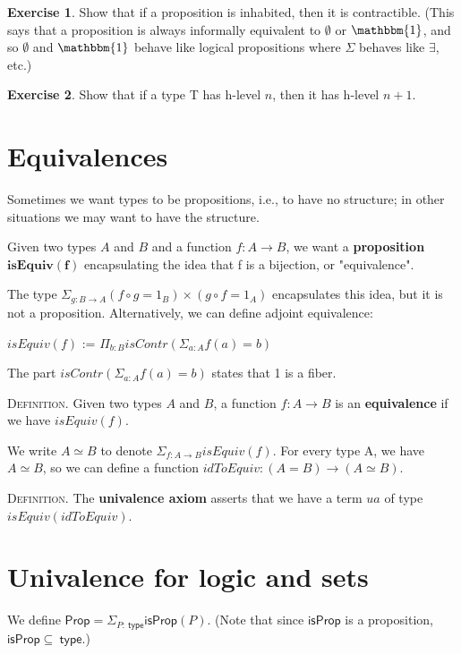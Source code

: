 \documentclass{amsart}
\theoremstyle{definition}
\newtheorem{ex}{Exercise}[section]
\newcommand{\type}{\ensuremath{\mathsf{~type}}}
\newcommand{\Prop}{\ensuremath{\mathsf{Prop}}}
\newcommand{\isProp}{\ensuremath{\mathsf{isProp}}}
\begin{document}
\begin{ex}
Show that if a proposition is inhabited, then it is contractible. (This says that a proposition is always informally equivalent to $\emptyset$ or $\mathbbm{1}$, and so $\emptyset$ and $\mathbbm{1}$ behave like logical propositions where $\Sigma$ behaves like $\exists$, etc.) %
\end{ex}

\begin{ex}
Show that if a type T has h-level $n$, then it has h-level $n + 1$.
\end{ex}

\section{Equivalences}
Sometimes we want types to be propositions, i.e., to have no structure; in other situations we may want to have the structure.

Given two types $A$ and $B$ and a function $f : A \rightarrow B$, we want a \textbf{proposition} $\mathbf{isEquiv(f)}$ encapsulating the idea that f is a bijection, or "equivalence".

The type $\Sigma_{g : B \rightarrow A} (f \circ g = 1_B) \times (g \circ f = 1_A)$ encapsulates this idea, but it is not a  proposition. Alternatively, we can define adjoint equivalence:


$isEquiv(f)$ := $\Pi_{b : B} isContr(\Sigma_{a : A} f(a)=b)$

The part $isContr(\Sigma_{a : A} f(a)=b)$ states that 1 is a fiber. %

\textsc{Definition.} Given two types $A$ and $B$, a function $f : A \rightarrow B$ is an \textbf{equivalence} if we have $isEquiv(f)$.

We write $A \simeq B$ to denote $\Sigma_{f : A \rightarrow B} isEquiv(f)$. For every type A, we have $A \simeq B$, so we can define a function $idToEquiv: (A=B) \rightarrow (A \simeq B)$.

\textsc{Definition.} The \textbf{univalence axiom} asserts that we have a term $ua$ of type $isEquiv(idToEquiv)$.

\section{Univalence for logic and sets}

We define $\Prop = \Sigma_{P:\type} \isProp (P)$. (Note that since $\isProp$ is a proposition, $\isProp \subseteq \type$.)
\end{document}
